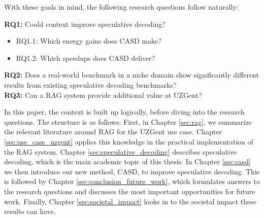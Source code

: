 With these goals in mind, the following research questions follow naturally:

\begin{tcolorbox}[colback=blue-ish-light,colframe=blue-ish,title=\textbf{Research Questions}, coltitle=white]
    \textbf{RQ1:} Could context improve speculative decoding?
    \begin{itemize}
    \item RQ1.1: Which energy gains does CASD make?
    \item RQ1.2: Which speedups does CASD deliver?
    \end{itemize}
    \textbf{RQ2:} Does a real-world benchmark in a niche domain show significantly different results from existing speculative decoding benchmarks? \\
    \textbf{RQ3:} Can a RAG system provide additional value at UZGent? \\
\end{tcolorbox}

In this paper, the context is built up logically, before diving into the research questions. The structure is as follows: First, in Chapter \ref{sec:rag}, we summarize the relevant literature around RAG for the UZGent use case. Chapter \ref{sec:use_case_uzgent} applies this knowledge in the practical implementation of the RAG system. Chapter \ref{sec:speculative_decoding} describes speculative decoding, which is the main academic topic of this thesis. In Chapter \ref{sec:casd} we then introduce our new method, CASD, to improve speculative decoding. This is followed by Chapter \ref{sec:conclusion_future_work}, which formulates answers to the research questions and discusses the most important opportunities for future work. Finally, Chapter \ref{sec:societal_impact} looks in to the societal impact these results can have.